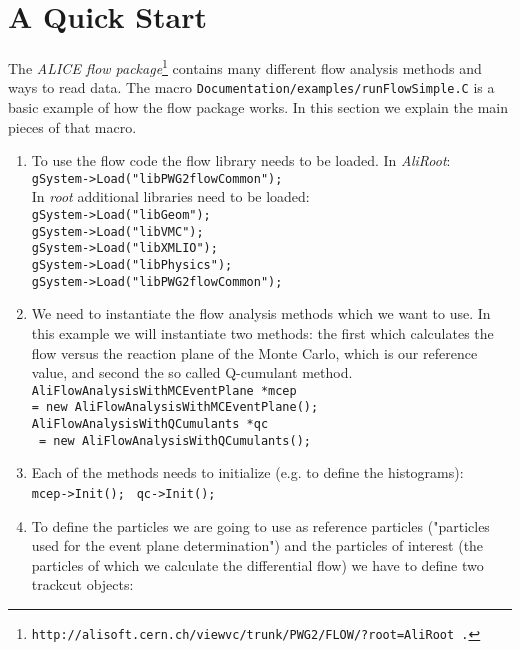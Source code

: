 \chapter{A Quick Start}
\label{quickstart}
The \textit{ALICE flow package}\footnote{\texttt{http://alisoft.cern.ch/viewvc/trunk/PWG2/FLOW/?root=AliRoot .}} contains many different flow analysis methods and ways to read data. 
The macro \texttt{Documentation/examples/runFlowSimple.C} 
 is a basic example of how the flow package works. 
In this section we explain the main pieces of that macro.

\begin{enumerate}
\item
To use the flow code the flow library needs to be loaded. In  \textit{AliRoot}:\\
\texttt{gSystem->Load("libPWG2flowCommon");}\\
In  \textit{root} additional libraries need to be loaded: \\
\texttt{gSystem->Load("libGeom");}\\
\texttt{gSystem->Load("libVMC");}\\
\texttt{gSystem->Load("libXMLIO");}\\
\texttt{gSystem->Load("libPhysics");}\\
\texttt{gSystem->Load("libPWG2flowCommon");}\\
\item
We need to instantiate the flow analysis methods which we want to use. In this example we will
instantiate two methods: the first  which calculates the flow versus the reaction plane of the Monte Carlo, which is our reference value, and second the so called Q-cumulant method.
\texttt{AliFlowAnalysisWithMCEventPlane *mcep} \\
\texttt{= new AliFlowAnalysisWithMCEventPlane();}\\
\texttt{AliFlowAnalysisWithQCumulants *qc}\\
 \texttt{ = new AliFlowAnalysisWithQCumulants();}\\
 \item
 Each of the methods needs to initialize (e.g. to define the histograms): \\
 \texttt{mcep->Init(); }
\texttt{qc->Init();}\\
\item
To define the particles we are going to use as reference particles ("particles 
used for the event plane determination") and the particles of interest (the particles of which we calculate the differential flow) we have to define two trackcut objects:\\

\end{enumerate}
